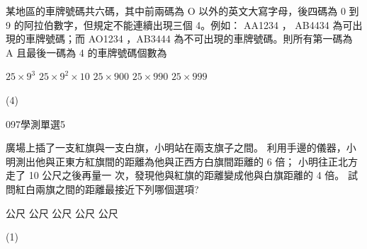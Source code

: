 \begin{QUESTIONS}
\begin{QUESTION}
        \begin{QBODY}
			某地區的車牌號碼共六碼，其中前兩碼為 O 以外的英文大寫字母，後四碼為 0 到 9 的阿拉伯數字，但規定不能連續出現三個 4。例如： AA1234 ， AB4434 為可出現的車牌號碼；而 AO1234 ，AB3444 為不可出現的車牌號碼。則所有第一碼為 A 且最後一碼為 4 的車牌號碼個數為 
			\begin{QOPS}
				\QOP $25 \times 9^3$ 
				\QOP $25\times 9^2 \times 10$        
				\QOP $25 \times 900$
				\QOP $25 \times 990$ 
				\QOP $25 \times 999$ 
			\end{QOPS}
        \end{QBODY}
        \begin{QFROMS}
        \end{QFROMS}
        \begin{QTAGS}\end{QTAGS}
        \begin{QANS}
            (4)
        \end{QANS}
        \begin{QSOLLIST}
        \end{QSOLLIST}
        \begin{QEMPTYSPACE}
        \end{QEMPTYSPACE}
    \end{QUESTION}
    \begin{QUESTION}
        \begin{ExamInfo}{097}{學測}{單選}{5}
        \end{ExamInfo}
        \begin{ExamAnsRateInfo}{41}{74}{32}{17}
        \end{ExamAnsRateInfo}
        \begin{QBODY}
			廣場上插了一支紅旗與一支白旗，小明站在兩支旗子之間。		利用手邊的儀器，小明測出他與正東方紅旗間的距離為他與正西方白旗間距離的 6 倍；			小明往正北方走了 10 公尺之後再量一 次，發現他與紅旗的距離變成他與白旗距離的 4 倍。			試問紅白兩旗之間的距離最接近下列哪個選項?
			\begin{QOPS} 
				\QOP 60 公尺 
				\QOP 65 公尺    
				\QOP 70 公尺 
				\QOP 75 公尺 
				\QOP 80 公尺
			\end{QOPS}
        \end{QBODY}
        \begin{QFROMS}
        \end{QFROMS}
        \begin{QTAGS}\end{QTAGS}
        \begin{QANS}
            (1)
        \end{QANS}
        \begin{QSOLLIST}
        \end{QSOLLIST}
        \begin{QEMPTYSPACE}
        \end{QEMPTYSPACE}
    \end{QUESTION}
\end{QUESTIONS}

